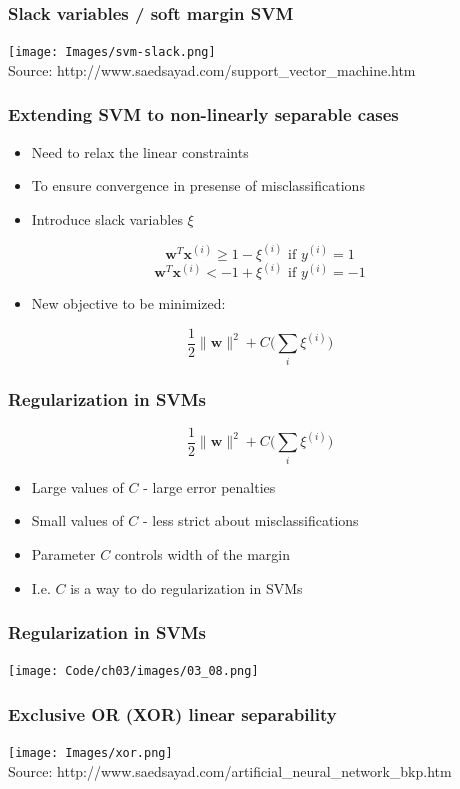 \documentclass{beamer}
\begin{document}
\begin{frame}
  \frametitle{Slack variables / soft margin SVM}
  \texttt{[image: Images/svm-slack.png]}
  \\
  \tiny{Source: http://www.saedsayad.com/support\_vector\_machine.htm}
\end{frame}


\begin{frame}
  \frametitle{Extending SVM to non-linearly separable cases}
  \begin{itemize}
  \item Need to relax the linear constraints
  \item To ensure convergence in presense of misclassifications
  \item Introduce slack variables $\xi$
  \end{itemize}
  \[
  \mathbf{w}^T \mathbf{x}^{(i)} \ge 1 - \xi^{(i)} \text{ if } y^{(i)} = 1
  \]
  \[
  \mathbf{w}^T \mathbf{x}^{(i)} < -1 + \xi^{(i)} \text{ if } y^{(i)} = -1
  \]
  \begin{itemize}
  \item New objective to be minimized:
  \end{itemize}
  \[
  \frac{1}{2} \lVert \mathbf{w} \rVert^2 + C \Big(\sum_i \xi^{(i)} \Big)
  \]
\end{frame}

\begin{frame}
  \frametitle{Regularization in SVMs}
  \[
  \frac{1}{2} \lVert \mathbf{w} \rVert^2 + C \Big(\sum_i \xi^{(i)} \Big)
  \]
  \begin{itemize}
  \item Large values of $C$ - large error penalties
  \item Small values of $C$ - less strict about misclassifications
  \item Parameter $C$ controls width of the margin
  \item I.e. $C$ is a way to do regularization in SVMs
  \end{itemize}
\end{frame}

\begin{frame}
  \frametitle{Regularization in SVMs}
  \texttt{[image: Code/ch03/images/03\_08.png]}
\end{frame}

\begin{frame}
  \frametitle{Exclusive OR (XOR) linear separability}
  \texttt{[image: Images/xor.png]}
  \\
  \tiny{Source: http://www.saedsayad.com/artificial\_neural\_network\_bkp.htm}
\end{frame}
\end{document}
